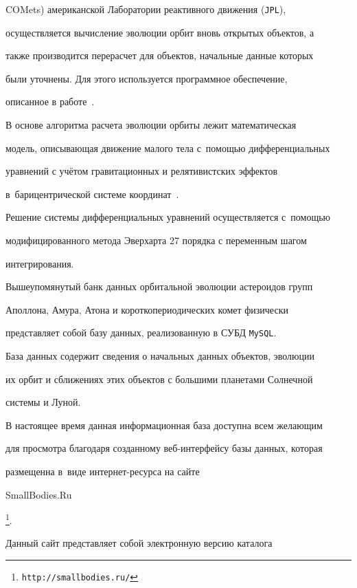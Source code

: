 COMets) американской Лаборатории реактивного движения ({\tt JPL}),


осуществляется вычисление эволюции орбит вновь открытых объектов, а


также производится перерасчет для объектов, начальные данные которых


были уточнены. Для этого используется программное обеспечение,


описанное в работе~\cite{Abramov:bib:bank}.





В основе алгоритма расчета эволюции орбиты лежит математическая


модель, описывающая движение малого тела с~помощью дифференциальных


уравнений с учётом гравитационных и релятивистских эффектов 


в~барицентрической системе координат~\cite{Abramov:bib:newhall}.


Решение системы дифференциальных уравнений осуществляется с~помощью


модифицированного метода Эверхарта 27 порядка с переменным шагом


интегрирования.





Вышеупомянутый банк данных орбитальной эволюции астероидов групп


Аполлона, Амура, Атона и короткопериодических комет физически


представляет собой базу данных, реализованную в СУБД {\tt MySQL}.


База данных содержит сведения о начальных данных объектов, эволюции


их орбит и сближениях этих объектов с большими планетами Солнечной


системы и Луной.





В настоящее время данная информационная база доступна всем желающим


для просмотра благодаря созданному веб-интерфейсу базы данных, которая 


размещенна в~виде интернет-ресурса на сайте {\tt


SmallBodies.Ru}\footnote{\tt http://smallbodies.ru/}\!\!\!.





Данный сайт представляет собой электронную версию каталога


